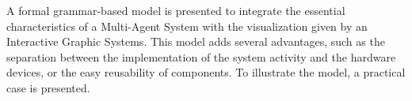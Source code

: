 \fontsize{9}{11}\selectfont A formal grammar-based model is presented to integrate 
the essential characteristics of a Multi-Agent System with the visualization given 
by an Interactive Graphic Systems. This model adds
several advantages, such as the separation between the implementation of the system activity and
the hardware devices, or the easy reusability of components. 
To illustrate the model, a practical case is presented.
